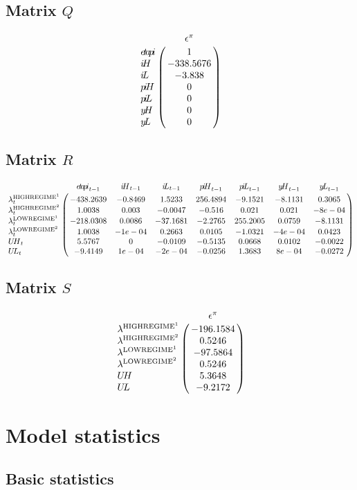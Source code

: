 \subsection*{Matrix $Q$}

$$\bordermatrix{
~ & \epsilon^{\pi} \cr
{e\!t\!a\!p\!i} & 1 \cr
{i\!H} & -338.5676 \cr
{i\!L} & -3.838 \cr
{p\!i\!H} & 0 \cr
{p\!i\!L} & 0 \cr
{y\!H} & 0 \cr
{y\!L} & 0 \cr
}$$

\subsection*{Matrix $R$}

$$\bordermatrix{
~ & {e\!t\!a\!p\!i}_{t-1} & {i\!H}_{t-1} & {i\!L}_{t-1} & {p\!i\!H}_{t-1} & {p\!i\!L}_{t-1} & {y\!H}_{t-1} & {y\!L}_{t-1} \cr
\lambda^{\mathrm{HIGHREGIME}^{\mathrm{1}}}_{t} & -438.2639 & -0.8469 & 1.5233 & 256.4894 & -9.1521 & -8.1131 & 0.3065 \cr
\lambda^{\mathrm{HIGHREGIME}^{\mathrm{2}}}_{t} & 1.0038 & 0.003 & -0.0047 & -0.516 & 0.021 & 0.021 & -8e-04 \cr
\lambda^{\mathrm{LOWREGIME}^{\mathrm{1}}}_{t} & -218.0308 & 0.0086 & -37.1681 & -2.2765 & 255.2005 & 0.0759 & -8.1131 \cr
\lambda^{\mathrm{LOWREGIME}^{\mathrm{2}}}_{t} & 1.0038 & -1e-04 & 0.2663 & 0.0105 & -1.0321 & -4e-04 & 0.0423 \cr
{U\!H}_{t} & 5.5767 & 0 & -0.0109 & -0.5135 & 0.0668 & 0.0102 & -0.0022 \cr
{U\!L}_{t} & -9.4149 & 1e-04 & -2e-04 & -0.0256 & 1.3683 & 8e-04 & -0.0272 \cr
}$$

\subsection*{Matrix $S$}

$$\bordermatrix{
~ & \epsilon^{\pi} \cr
\lambda^{\mathrm{HIGHREGIME}^{\mathrm{1}}} & -196.1584 \cr
\lambda^{\mathrm{HIGHREGIME}^{\mathrm{2}}} & 0.5246 \cr
\lambda^{\mathrm{LOWREGIME}^{\mathrm{1}}} & -97.5864 \cr
\lambda^{\mathrm{LOWREGIME}^{\mathrm{2}}} & 0.5246 \cr
{U\!H} & 5.3648 \cr
{U\!L} & -9.2172 \cr
}$$


\section{Model statistics}

\subsection{Basic statistics}


